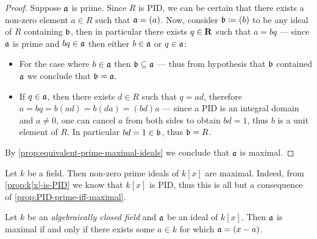 \begin{proof}
    Suppose \(\mathfrak{a}\) is prime. Since \(R\) is PID, we can be certain that there
    exists a non-zero element \(a \in R\) such that \(\mathfrak{a} = (a)\). Now,
    consider \(\mathfrak{b} \coloneq (b)\) to be any ideal of \(R\) containing
    \(\mathfrak{b}\), then in particular there exists \(q \in \mathbf{R}\) such that
    \(a = b q\) --- since \(\mathfrak{a}\) is prime and \(bq \in \mathfrak{a}\) then
    either \(b \in \mathfrak{a}\) or \(q \in \mathfrak{a}\):
    \begin{itemize}\setlength\itemsep{0em}
        \item For the case where \(b \in \mathfrak{a}\) then
              \(\mathfrak{b} \subseteq \mathfrak{a}\) --- thus from hypothesis that \(\mathfrak{b}\)
              contained \(\mathfrak{a}\) we conclude that \(\mathfrak{b} = \mathfrak{a}\).

        \item If \(q \in \mathfrak{a}\), then there exists \(d \in R\) such that
              \(q = a d\), therefore \(a = b q = b (a d) = b (d a) = (b d) a\) --- since
              a PID is an integral domain and \(a \neq 0\), one can cancel \(a\) from both
              sides to obtain \(b d = 1\), thus \(b\) is a unit element of \(R\). In
              particular \(b d = 1 \in \mathfrak{b}\), thus \(\mathfrak{b} = R\).
    \end{itemize}
    By \cref{prop:equivalent-prime-maximal-ideals} we conclude that \(\mathfrak{a}\) is
    maximal.
\end{proof}

\begin{example}
    \label{exp:prime-ideals-of-k[x]-are-maximal}
    Let \(k\) be a field. Then non-zero prime ideals of \(k[x]\) are
    maximal. Indeed, from \cref{prop:k[x]-is-PID} we know that \(k[x]\) is PID, thus
    this is all but a consequence of \cref{prop:PID-prime-iff-maximal}.
\end{example}

\begin{proposition}
    \label{prop:alg-closed-field-maximal-iff-(x-a)}
    Let \(k\) be an \emph{algebraically closed field} and \(\mathfrak{a}\) be an ideal
    of \(k[x]\). Then \(\mathfrak{a}\) is maximal if and only if there exists some
    \(a \in k\) for which \(\mathfrak{a} = (x - a)\).
\end{proposition}

